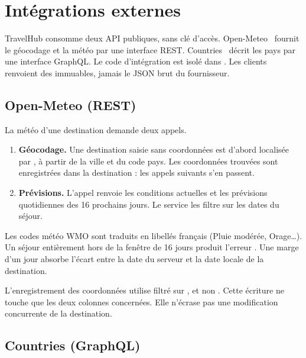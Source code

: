 \section{Intégrations externes}
\label{sec:integrations}

TravelHub consomme deux API publiques, sans clé d'accès. Open-Meteo~\cite{openmeteo,openmeteogeo} fournit le géocodage et la météo par une interface REST. Countries~\cite{countries} décrit les pays par une interface GraphQL. Le code d'intégration est isolé dans . Les clients renvoient des  immuables, jamais le JSON brut du fournisseur.

\subsection{Open-Meteo (REST)}

La météo d'une destination demande deux appels.
\begin{enumerate}
  \item \textbf{Géocodage.} Une destination saisie sans coordonnées est d'abord localisée par , à partir de la ville et du code pays. Les coordonnées trouvées sont enregistrées dans la destination : les appels suivants s'en passent.
  \item \textbf{Prévisions.} L'appel  renvoie les conditions actuelles et les prévisions quotidiennes des 16 prochains jours. Le service les filtre sur les dates du séjour.
\end{enumerate}

Les codes météo WMO sont traduits en libellés français (\og{}Pluie modérée\fg{}, \og{}Orage\fg{}\ldots). Un séjour entièrement hors de la fenêtre de 16 jours produit l'erreur . Une marge d'un jour absorbe l'écart entre la date du serveur et la date locale de la destination.

L'enregistrement des coordonnées utilise  filtré sur , et non . Cette écriture ne touche que les deux colonnes concernées. Elle n'écrase pas une modification concurrente de la destination.

\subsection{Countries (GraphQL)}


